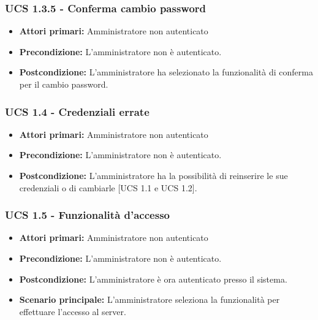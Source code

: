 \subsubsection{UCS 1.3.5 - Conferma cambio password}%
\begin{itemize}
\item \textbf{Attori primari:} Amministratore non autenticato
\item \textbf{Precondizione:} L'amministratore non è autenticato.
\item \textbf{Postcondizione:} L'amministratore ha selezionato la funzionalità di conferma per il cambio password.
\end{itemize}

\subsubsection{UCS 1.4 - Credenziali errate}%
\begin{itemize}
\item \textbf{Attori primari:} Amministratore non autenticato
\item \textbf{Precondizione:} L'amministratore non è autenticato.
\item \textbf{Postcondizione:} L'amministratore ha la possibilità di reinserire le sue credenziali o di cambiarle [UCS 1.1 e UCS 1.2].
\end{itemize}

\subsubsection{UCS 1.5 - Funzionalità d'accesso}%
\begin{itemize}
\item \textbf{Attori primari:} Amministratore non autenticato
\item \textbf{Precondizione:} L'amministratore non è autenticato.
\item \textbf{Postcondizione:} L'amministratore è ora autenticato presso il sistema.
\item \textbf{Scenario principale:} L'amministratore seleziona la funzionalità per effettuare l'accesso al server.
\end{itemize}

